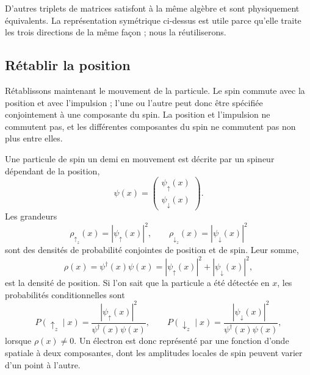 \begin{classroomqa}\end{classroomqa}

D’autres triplets de matrices satisfont à la même algèbre et sont physiquement équivalents. La représentation symétrique ci-dessus est utile parce qu’elle traite les trois directions de la même façon ; nous la réutiliserons.

\subsection{Rétablir la position}

Rétablissons maintenant le mouvement de la particule. Le spin commute avec la position et avec l’impulsion ; l’une ou l’autre peut donc être spécifiée conjointement à une composante du spin. La position et l’impulsion ne commutent pas, et les différentes composantes du spin ne commutent pas non plus entre elles.

Une particule de spin un demi en mouvement est décrite par un spineur dépendant de la position,
\begin{equation}
\psi(x)=
\begin{pmatrix}
\psi_\uparrow(x)\\
\psi_\downarrow(x)
\end{pmatrix}.
\end{equation}
Les grandeurs
\begin{equation}
\rho_{\uparrow_z}(x)=|\psi_\uparrow(x)|^2,
\qquad
\rho_{\downarrow_z}(x)=|\psi_\downarrow(x)|^2
\end{equation}
sont des densités de probabilité conjointes de position et de spin. Leur somme,
\begin{equation}
\rho(x)=\psi^\dagger(x)\psi(x)
=|\psi_\uparrow(x)|^2+|\psi_\downarrow(x)|^2,
\end{equation}
est la densité de position. Si l’on sait que la particule a été détectée en \(x\), les probabilités conditionnelles sont
\begin{equation}
P(\uparrow_z\mid x)
=
\frac{|\psi_\uparrow(x)|^2}{\psi^\dagger(x)\psi(x)},
\qquad
P(\downarrow_z\mid x)
=
\frac{|\psi_\downarrow(x)|^2}{\psi^\dagger(x)\psi(x)},
\end{equation}
lorsque \(\rho(x)\neq0\). Un électron est donc représenté par une fonction d’onde spatiale à deux composantes, dont les amplitudes locales de spin peuvent varier d’un point à l’autre.

